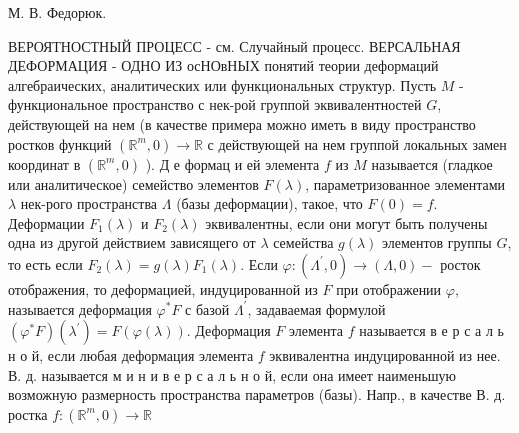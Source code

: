 \documentclass[10pt]{article}
\begin{document}
М. В. Федорюк.



ВЕРОЯТНОСТНЫЙ ПРОЦЕСС - см. Случайный процесс. ВЕРСАЛЬНАЯ ДЕФОРМАЦИЯ - ОДНО ИЗ осНОвНЫХ понятий теории деформаций алгебраических, аналитических или функциональных структур. Пусть $M$ - функциональное пространство с нек-рой группой эквивалентностей $G$, действующей на нем (в качестве примера можно иметь в виду пространство ростков функций $\left(\mathbb{R}^{m}, 0\right) \rightarrow \mathbb{R}$ с действующей на нем группой локальных замен координат в $\left(\mathbb{R}^{m}, 0\right)$ ). Д е формац и ей элемента $f$ из $M$ называется (гладкое или аналитическое) семейство элементов $F(\lambda)$, параметризованное элементами $\lambda$ нек-рого пространства $\Lambda$ (базы деформации), такое, что $F(0)=f$. Деформации $F_{1}(\lambda)$ и $F_{2}(\lambda)$ эквивалентны, если они могут быть получены одна из другой действием зависящего от $\lambda$ семейства $g(\lambda)$ элементов группы $G$, то есть если $F_{2}(\lambda)=g(\lambda) F_{1}(\lambda)$. Если $\varphi:\left(\Lambda^{\prime}, 0\right) \rightarrow(\Lambda, 0)-$ росток отображения, то деформацией, индуцированной из $F$ при отображении $\varphi$, называется деформация $\varphi^{*} F$ с базой $\Lambda^{\prime}$, задаваемая формулой $\left(\varphi^{*} F\right)\left(\lambda^{\prime}\right)=F(\varphi(\lambda))$. Деформация $F$ элемента $f$ называется в е р с а л ь н о й, если любая деформация элемента $f$ эквивалентна индуцированной из нее. В. д. называется м и н и в е р с а л ь н о й, если она имеет наименьшую возможную размерность пространства параметров (базы). Напр., в качестве В. д. ростка $f:\left(\mathbb{R}^{m}, 0\right) \rightarrow \mathbb{R}$
\end{document}
